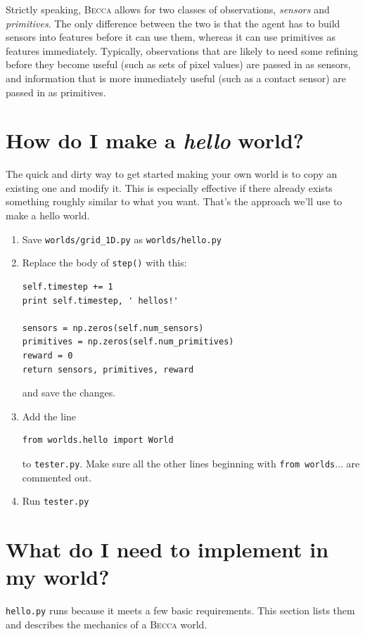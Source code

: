 Strictly speaking, \textsc{Becca} allows for two classes of observations, {\em sensors} and {\em primitives}. The only difference between the two is that the agent has to build sensors into features before it can use them, whereas it can use primitives as features immediately. Typically, observations that are likely to need some refining before they become useful (such as sets of pixel values) are passed in as sensors, and information that is more immediately useful (such as a contact sensor) are passed in as primitives. 

\section{How do I make a {\em hello} world?}

The quick and dirty way to get started making your own world is to copy an existing one and modify it. This is especially effective if there already exists something roughly similar to what you want. That's the approach we'll use to make a hello world.

\begin{enumerate}
\item{Save \texttt{worlds/grid\_1D.py} as \texttt{worlds/hello.py}}
\item{Replace the body of \texttt{step()} with this:
\begin{verbatim}
self.timestep += 1 
print self.timestep, ' hellos!'

sensors = np.zeros(self.num_sensors)
primitives = np.zeros(self.num_primitives)
reward = 0
return sensors, primitives, reward
\end{verbatim}
and save the changes.
}
\item{Add the line 
\begin{verbatim}
from worlds.hello import World
\end{verbatim}
to \texttt{tester.py}. Make sure all the other lines beginning with \texttt{from worlds}...  are commented out.
}
\item{Run \texttt{tester.py}}
\end{enumerate}


\section{What do I need to implement in my world?}

\texttt{hello.py} runs because it meets a few basic requirements. This section lists them and describes the mechanics of a \textsc{Becca} world.

